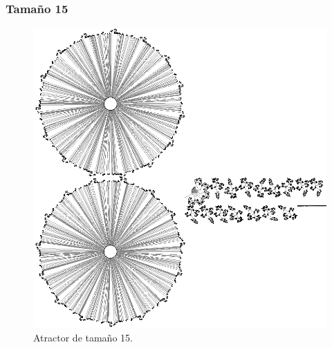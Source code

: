 \documentclass[11pt]{article}
\begin{document}
			\subsubsection{Tamaño 15}
			\begin{figure}[H]
			\centering
			\includegraphics[scale=0.8]{resources/Atractores54/atractor_54_size_15.png}
			\caption{Atractor de tamaño 15.}\label{fig:picture}
			\end{figure}
\end{document}
